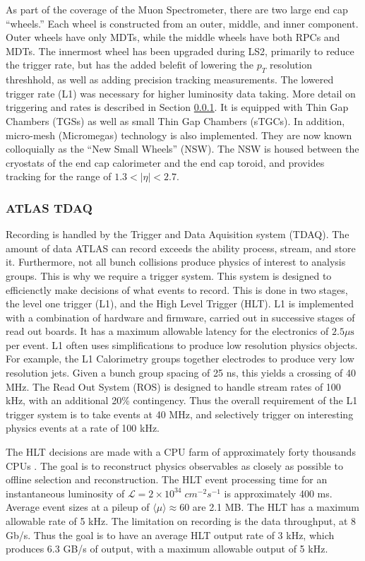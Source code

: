 \documentclass[12pt]{article}
\begin{document}
As part of the coverage of the Muon Spectrometer, there are two large end cap
``wheels.'' Each wheel is constructed from an outer, middle, and inner
component. Outer wheels have only MDTs, while the middle wheels have both RPCs
and MDTs. The innermost wheel has been upgraded during LS2, primarily to reduce
the trigger rate, but has the added belefit of lowering the $p_T$ resolution
threshhold, as well as adding precision tracking measurements. The lowered
trigger rate (L1) was necessary for higher luminosity data taking. More detail
on triggering and rates is described in Section \ref{sec:tdaq}. It
is equipped with Thin Gap Chambers (TGSs) as well as small Thin Gap Chambers
(sTGCs). In addition, micro-mesh (Micromegas) technology is also implemented.
They are now known colloquially as the ``New Small Wheels'' (NSW). The NSW is
housed between the cryostats of the end cap calorimeter and the end cap toroid,
and provides tracking for the range of $1.3<|\eta|<2.7$. 

\subsubsection{ATLAS TDAQ}\label{sec:tdaq}
Recording is handled by the Trigger and Data Aquisition system (TDAQ). The
amount of data ATLAS can record exceeds the ability process, stream, and store
it. Furthermore, not all bunch collisions produce physics of interest to
analysis groups. This is why we require a trigger system. This system is
designed to efficienctly make decisions of what events to record. This is done
in two stages, the level one trigger (L1), and the High Level Trigger (HLT). L1
is implemented with a combination of hardware and firmware, carried out in
successive stages of read out boards. It has a maximum allowable latency for the
electronics of $2.5 \mu\text{s}$ per event. L1 often uses simplifications to
produce low resolution physics objects. For example, the L1 Calorimetry groups
together electrodes to produce very low resolution jets. Given a bunch group
spacing of 25 ns, this yields a crossing of 40 MHz. The Read Out System (ROS) is
designed to handle stream rates of 100 kHz, with an additional 20\% contingency.
Thus the overall requirement of the L1 trigger system is to take events at 40
MHz, and selectively trigger on interesting physics events at a rate of 100 kHz.

The HLT decisions are made with a CPU farm of approximately forty thousands CPUs
\cite{HLT_2016}. The goal is to reconstruct physics observables as closely as
possible to offline selection and reconstruction. The HLT event processing time
for an instantaneous luminosity of $\mathscr{L} = 2\times
10^{34}\;cm^{-2}s^{-1}$ is approximately 400 ms.  Average event sizes at a
pileup of $\langle\mu\rangle \approx 60$ are 2.1 MB. The HLT has a maximum
allowable rate of 5 kHz. The limitation on recording is the data throughput, at
8 Gb/s. Thus the goal is to have an average HLT output rate of 3 kHz, which
produces 6.3 GB/s of output, with a maximum allowable output of 5 kHz.
\end{document}
